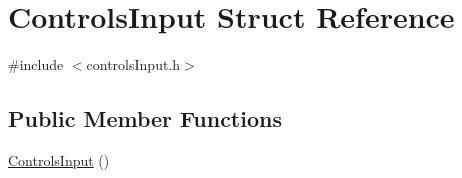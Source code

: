 \hypertarget{struct_controls_input}{}\section{Controls\+Input Struct Reference}
\label{struct_controls_input}


{\ttfamily \#include $<$controls\+Input.\+h$>$}

\subsection*{Public Member Functions}
\begin{DoxyCompactItemize}
\item 
\hyperlink{struct_controls_input_a8df69a74d53e061f3b003a0a6709c1c7}{Controls\+Input} ()
\end{DoxyCompactItemize}
